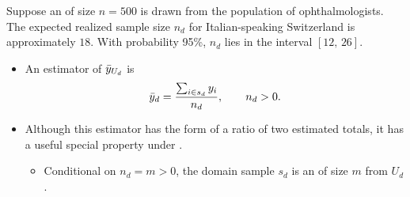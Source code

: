 \documentclass{my_eth_beamer}
\numberwithin{equation}{section}
\begin{document}
\begin{frame}
    \begin{Bsp}[Ophthalmologists]\label{ex:srs_augenarzt}
        \vspace{-0.5em}
        \noindent Suppose an \SRS of size $n = 500$ is drawn from the
        population of ophthalmologists. The expected realized sample size
        $n_d$ for Italian-speaking Switzerland is approximately $18$. With
        probability 95\%, $n_d$ lies in the interval $[12,\,26]$.
    \end{Bsp}
    \vspace{0.5em}
    \begin{itemize}
    \setlength{\itemsep}{8pt}
        \item An estimator of $\bar{y}_{U_d}$ is
            \begin{equation*}
                \bar{y}_{d}
                =
                \frac{\sum_{i \in s_d} y_i}{n_d},
                \qquad n_d > 0.
            \end{equation*}
        \item Although this estimator has the form of a ratio of two estimated
            totals, it has a useful special property under \SRS.
            \vspace{0.25em}
            \begin{itemize}
                \item[\goto] \alert{Conditional} on $n_d = m > 0$, the domain
                    sample $s_d$ is an \alert{\SRS of size $m$ from $U_d$}.
            \end{itemize}
    \end{itemize}
\end{frame}
\end{document}
